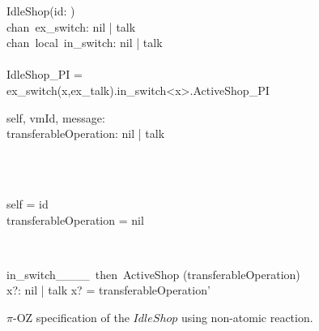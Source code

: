 \begin{figure}[H]
\centering
\begin{class}{IdleShop(id: \integer)}
\ 
\\chan\ ex\_switch: nil | talk
\ 
\\chan\ local\ in\_switch: nil | talk
\ \\ \
\\IdleShop\_PI = 
\\ \qquad  ex\_switch(x,ex\_talk).in\_switch<x>.ActiveShop\_PI
\\
\begin{state}
self, vmId, message: \integer
\\transferableOperation: nil | talk
\end{state} 
\\
\begin{init}
\\self = id
\\transferableOperation = nil
\end{init} 
\\
\begin{op}{in\_switch\_\_\_\_\ then\ ActiveShop}
\Delta (transferableOperation)
\\x?: nil | talk
\ST
x? = transferableOperation'
\end{op}
\end{class}
\caption{$\pi$-OZ specification of the $IdleShop$ using non-atomic reaction.}
\label{comp_oz_pi_statefull_idleShop_non_atomic}
\end{figure}